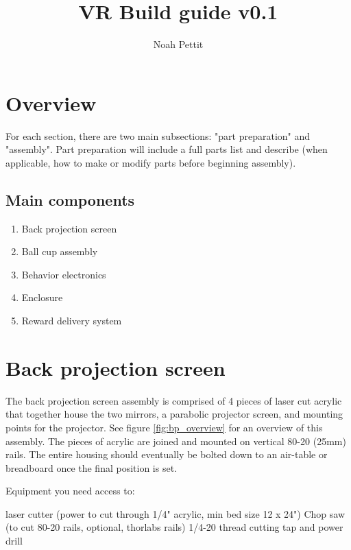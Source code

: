 \documentclass[letter]{article}
\title{VR Build guide v0.1}
\author{Noah Pettit}
\begin{document}
\maketitle


\section{Overview}

For each section, there are two main subsections: "part preparation" and "assembly". Part preparation will include a full parts list and describe (when applicable, how to make or modify parts before beginning assembly). 

\subsection{Main components}
\begin{enumerate}
    \item Back projection screen
    \item Ball cup assembly
    \item Behavior electronics
    \item Enclosure
    \item Reward delivery system
    
\end{enumerate}

\section{Back projection screen}

The back projection screen assembly is comprised of 4 pieces of laser cut acrylic that together house the two mirrors, a parabolic projector screen, and mounting points for the projector. See figure \ref{fig:bp_overview} for an overview of this assembly.
The pieces of acrylic are joined and mounted on vertical 80-20 (25mm) rails. The entire housing should eventually be bolted down to an air-table or breadboard once the final position is set. 

Equipment you need access to: 

laser cutter (power to cut through 1/4" acrylic, min bed size 12 x 24")
Chop saw (to cut 80-20 rails, optional, thorlabs rails)
1/4-20 thread cutting tap and power drill
\end{document}
